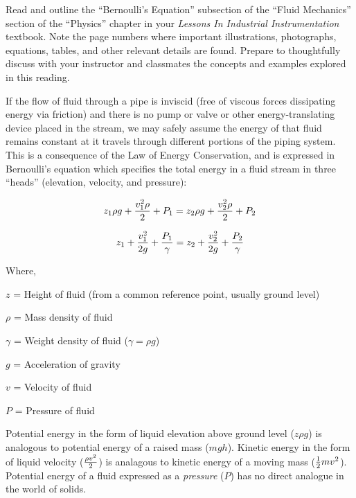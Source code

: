 

Read and outline the ``Bernoulli's Equation'' subsection of the ``Fluid Mechanics'' section of the ``Physics'' chapter in your {\it Lessons In Industrial Instrumentation} textbook.  Note the page numbers where important illustrations, photographs, equations, tables, and other relevant details are found.  Prepare to thoughtfully discuss with your instructor and classmates the concepts and examples explored in this reading.














If the flow of fluid through a pipe is inviscid (free of viscous forces dissipating energy via friction) and there is no pump or valve or other energy-translating device placed in the stream, we may safely assume the energy of that fluid remains constant at it travels through different portions of the piping system.  This is a consequence of the Law of Energy Conservation, and is expressed in Bernoulli's equation which specifies the total energy in a fluid stream in three ``heads'' (elevation, velocity, and pressure):

$$z_1 \rho g + {v_1^2 \rho \over 2} + P_1 = z_2 \rho g + {v_2^2 \rho \over 2} + P_2$$

$$z_1 + {v_1^2 \over {2 g}} + {P_1 \over \gamma} = z_2 + {v_2^2 \over {2 g}} + {P_2 \over \gamma}$$

\noindent
Where,

$z$ = Height of fluid (from a common reference point, usually ground level)

$\rho$ = Mass density of fluid

$\gamma$ = Weight density of fluid ($\gamma = \rho g$)

$g$ = Acceleration of gravity

$v$ = Velocity of fluid

$P$ = Pressure of fluid

\vskip 10pt

Potential energy in the form of liquid elevation above ground level ($z \rho g$) is analogous to potential energy of a raised mass ($mgh$).  Kinetic energy in the form of liquid velocity ($\rho v^2 \over 2$) is analagous to kinetic energy of a moving mass (${1 \over 2} mv^2$).  Potential energy of a fluid expressed as a {\it pressure} ($P$) has no direct analogue in the world of solids.

